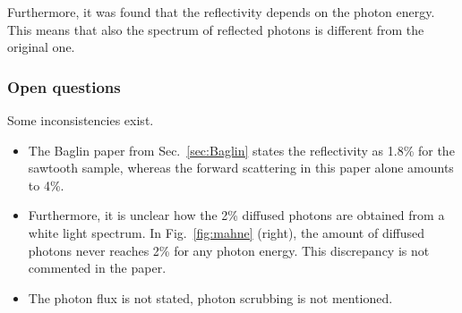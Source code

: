 Furthermore, it was found that the reflectivity depends on the photon energy.
This means that also the spectrum of reflected photons is different from the original one.


\subsubsection{Open questions}
Some inconsistencies exist.
\begin{itemize}
    \item The Baglin paper from Sec.~\ref{sec:Baglin} states the reflectivity as 1.8\% for the sawtooth sample, whereas the forward scattering in this paper alone amounts to 4\%.
    \item Furthermore, it is unclear how the 2\% diffused photons are obtained from a white light spectrum.
        In Fig.~\ref{fig:mahne} (right), the amount of diffused photons never reaches 2\% for any photon energy.
        This discrepancy is not commented in the paper.
    \item The photon flux is not stated, photon scrubbing is not mentioned.
\end{itemize}


